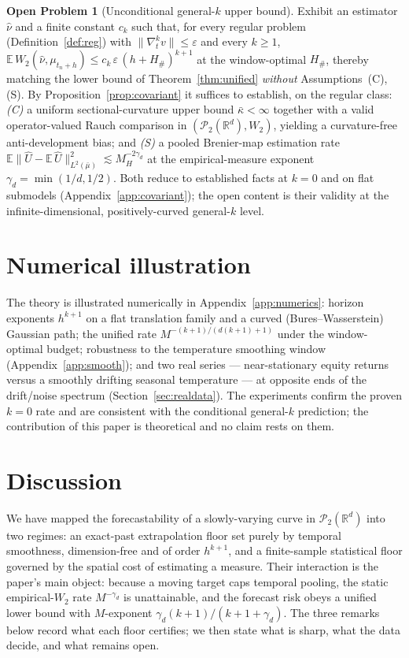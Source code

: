 \documentclass[11pt]{article}
\theoremstyle{definition}
\newtheorem{openproblem}{Open Problem}
\theoremstyle{remark}
\newcommand{\R}{\mathbb{R}}
\newcommand{\E}{\mathbb{E}}
\newcommand{\PP}{\mathcal{P}_2(\R^d)}
\begin{document}
\begin{openproblem}[Unconditional general-$k$ upper bound]\label{op:upper}
Exhibit an estimator $\widehat\nu$ and a finite constant $c_k$ such that, for every regular problem
(Definition~\ref{def:reg}) with $\|\nabla_t^k v\|\le\varepsilon$ and every $k\ge1$,
$\E\,W_2(\widehat\nu,\mu_{t_n+h})\le c_k\,\varepsilon\,(h+H_\#)^{k+1}$ at the window-optimal $H_\#$,
thereby matching the lower bound of Theorem~\ref{thm:unified} \emph{without} Assumptions~(C),(S). By
Proposition~\ref{prop:covariant} it suffices to establish, on the regular class: \emph{(C)} a uniform
sectional-curvature upper bound $\bar\kappa<\infty$ together with a valid operator-valued Rauch
comparison in $(\PP,W_2)$, yielding a curvature-free anti-development bias; and \emph{(S)} a pooled
Brenier-map estimation rate
$\E\|\widehat U-\E\,\widehat U\|_{L^2(\bar\mu)}^2\lesssim M_H^{-2\gamma_d}$ at the empirical-measure
exponent $\gamma_d=\min(1/d,1/2)$. Both reduce to established facts at $k=0$ and on flat submodels
(Appendix~\ref{app:covariant}); the open content is their validity at the infinite-dimensional,
positively-curved general-$k$ level.
\end{openproblem}


\section{Numerical illustration}\label{sec:numerics}
The theory is illustrated numerically in Appendix~\ref{app:numerics}: horizon exponents $h^{k+1}$
on a flat translation family and a curved (Bures--Wasserstein) Gaussian path; the unified rate
$M^{-(k+1)/(d(k+1)+1)}$ under the window-optimal budget; robustness to the temperature smoothing
window (Appendix~\ref{app:smooth}); and two real series --- near-stationary equity returns versus a
smoothly drifting seasonal temperature --- at opposite ends of the drift/noise spectrum
(Section~\ref{sec:realdata}). The experiments confirm the proven $k=0$ rate and are consistent with
the conditional general-$k$ prediction; the contribution of this paper is theoretical and no claim
rests on them.
\section{Discussion}

We have mapped the forecastability of a slowly-varying curve in $\PP$ into two regimes: an
exact-past extrapolation floor set purely by temporal smoothness, dimension-free and of order
$h^{k+1}$, and a finite-sample statistical floor governed by the spatial cost of estimating a
measure. Their interaction is the paper's main object: because a moving target caps temporal
pooling, the static empirical-$W_2$ rate $M^{-\gamma_d}$ is unattainable, and the forecast risk obeys
a unified lower bound with $M$-exponent $\gamma_d(k+1)/(k+1+\gamma_d)$. The three remarks below
record what each floor certifies; we then state what is sharp, what the data decide, and what
remains open.
\end{document}
